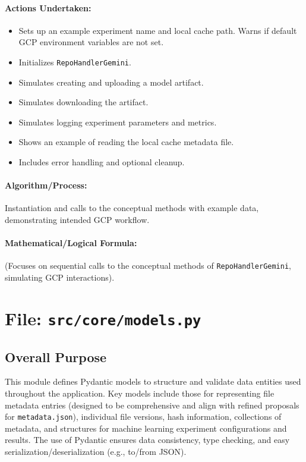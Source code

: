 \documentclass{article}
\begin{document}
\paragraph{Actions Undertaken:}
\begin{itemize}
    \item Sets up an example experiment name and local cache path. Warns if default GCP environment variables are not set.
    \item Initializes \texttt{RepoHandlerGemini}.
    \item Simulates creating and uploading a model artifact.
    \item Simulates downloading the artifact.
    \item Simulates logging experiment parameters and metrics.
    \item Shows an example of reading the local cache metadata file.
    \item Includes error handling and optional cleanup.
\end{itemize}
\paragraph{Algorithm/Process:} Instantiation and calls to the conceptual methods with example data, demonstrating intended GCP workflow.
\paragraph{Mathematical/Logical Formula:} (Focuses on sequential calls to the conceptual methods of \texttt{RepoHandlerGemini}, simulating GCP interactions).

\newpage
\section{File: \texttt{src/core/models.py}}
\subsection{Overall Purpose}
This module defines Pydantic models to structure and validate data entities used throughout the application. Key models include those for representing file metadata entries (designed to be comprehensive and align with refined proposals for \texttt{metadata.json}), individual file versions, hash information, collections of metadata, and structures for machine learning experiment configurations and results. The use of Pydantic ensures data consistency, type checking, and easy serialization/deserialization (e.g., to/from JSON).
\end{document}
